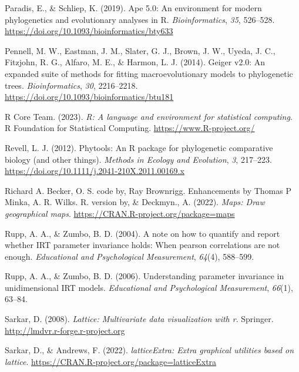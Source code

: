 \documentclass[
  jou]{apa6}
\newlength{\cslhangindent}
\newlength{\cslentryspacingunit} %
\newenvironment{CSLReferences}[2] %
 {%
  \setlength{\parindent}{0pt}
  \ifodd #1
  \let\oldpar\par
  \def\par{\hangindent=\cslhangindent\oldpar}
  \fi
  \setlength{\parskip}{#2\cslentryspacingunit}
 }%
 {}
\begin{document}
\begin{CSLReferences}{1}{0}
\leavevmode{}%
Paradis, E., \& Schliep, K. (2019). Ape 5.0: An environment for modern phylogenetics and evolutionary analyses in {R}. \emph{Bioinformatics}, \emph{35}, 526--528. \url{https://doi.org/10.1093/bioinformatics/bty633}

\leavevmode{}%
Pennell, M. W., Eastman, J. M., Slater, G. J., Brown, J. W., Uyeda, J. C., Fitzjohn, R. G., Alfaro, M. E., \& Harmon, L. J. (2014). Geiger v2.0: An expanded suite of methods for fitting macroevolutionary models to phylogenetic trees. \emph{Bioinformatics}, \emph{30}, 2216--2218. \url{https://doi.org/10.1093/bioinformatics/btu181}

\leavevmode{}%
R Core Team. (2023). \emph{R: A language and environment for statistical computing}. R Foundation for Statistical Computing. \url{https://www.R-project.org/}

\leavevmode{}%
Revell, L. J. (2012). Phytools: An {R} package for phylogenetic comparative biology (and other things). \emph{Methods in Ecology and Evolution}, \emph{3}, 217--223. \url{https://doi.org/10.1111/j.2041-210X.2011.00169.x}

\leavevmode{}%
Richard A. Becker, O. S. code by, Ray Brownrigg. Enhancements by Thomas P Minka, A. R. Wilks. R. version by, \& Deckmyn., A. (2022). \emph{Maps: Draw geographical maps}. \url{https://CRAN.R-project.org/package=maps}

\leavevmode{}%
Rupp, A. A., \& Zumbo, B. D. (2004). A note on how to quantify and report whether IRT parameter invariance holds: When pearson correlations are not enough. \emph{Educational and Psychological Measurement}, \emph{64}(4), 588--599.

\leavevmode{}%
Rupp, A. A., \& Zumbo, B. D. (2006). Understanding parameter invariance in unidimensional IRT models. \emph{Educational and Psychological Measurement}, \emph{66}(1), 63--84.

\leavevmode{}%
Sarkar, D. (2008). \emph{Lattice: Multivariate data visualization with r}. Springer. \url{http://lmdvr.r-forge.r-project.org}

\leavevmode{}%
Sarkar, D., \& Andrews, F. (2022). \emph{latticeExtra: Extra graphical utilities based on lattice}. \url{https://CRAN.R-project.org/package=latticeExtra}


\end{CSLReferences}
\end{document}
